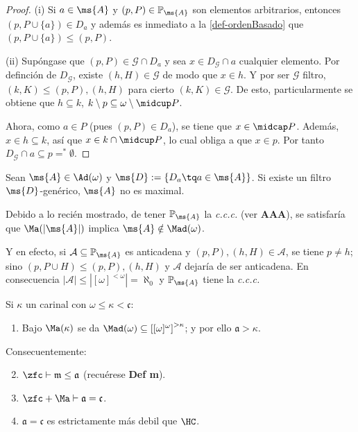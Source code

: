 	\begin{proof}
		(i) Si $a \in \ms{A}$ y $(p,P) \in \mathbb{P}_\ms{A}$ son elementos arbitrarios, entonces $(p,P\cup\{a\}) \in D_a$ y además es inmediato a la \autoref{def-ordenBasado} que $(p,P\cup\{a\}) \leq (p,P)$.

		(ii) Supóngase que $(p,P) \in \mathcal{G} \cap D_a$ y sea $x \in D_\mathcal{G} \cap a$ cualquier elemento. Por definción de $D_\mathcal{G}$, existe $(h,H) \in \mathcal{G}$ de modo que $x \in h$. Y por ser $\mathcal{G}$ filtro, $(k,K) \leq (p,P),(h,H)$ para cierto $(k,K) \in \mathcal{G}$. De esto, particularmente se obtiene que $h \subseteq k$, $k \setminus p \subseteq \omega \setminus \midcup P$.

		Ahora, como $a \in P$ (pues $(p,P)\in D_a$), se tiene que $x \in \midcap P$. Además, $x \in h \subseteq k$, así que $x \in k \cap \midcup P$, lo cual obliga a que $x \in p$. Por tanto $D_\mathcal{G} \cap a \subseteq p =^* \emptyset$. 
	\end{proof}

	\begin{corolario}\label{cor-SolovayDebil}
		Sean $\ms{A} \in \Ad(\omega)$ y $\ms{D}:=\{D_a \tq a \in \ms{A}\}$. Si existe un filtro $\ms{D}$-genérico, $\ms{A}$ no es maximal.
	\end{corolario}

	Debido a lo recién mostrado, de tener $\mathbb{P}_\ms{A}$ la \textit{c.c.c.} (ver \textbf{AAA}), se satisfaría que $\Ma(|\ms{A}|)$ implica $\ms{A} \notin \Mad(\omega)$.

	Y en efecto, si $\mathcal{A} \subseteq \mathbb{P}_\ms{A}$ es anticadena y $(p,P),(h,H) \in \mathcal{A}$, se tiene $p\neq h$; sino $(p,P \cup H) \leq (p,P),(h,H)$ y $\mathcal{A}$ dejaría de ser anticadena. En consecuencia $|\mathcal{A}|\leq|[\omega]^{<\omega}|=\aleph_0$ y $\mathbb{P}_\ms{A}$ tiene la \textit{c.c.c.}

	\begin{corolario}\label{cor-MaSimple}
		Si $\kappa$ un carinal con $\omega \leq \kappa <\mathfrak{c}$:
		\begin{enumerate}
			\item Bajo $\Ma(\kappa)$ se da $\Mad(\omega) \subseteq \left[[\omega]^\omega\right]^{>\kappa}$; y por ello $\mathfrak{a}>\kappa$.
		\end{enumerate}
		Consecuentemente:
		\begin{enumerate}\setcounter {enumi}{1}
			\item $\zfc \vdash \mathfrak{m} \leq \mathfrak{a}$ (recuérese \textbf{Def m}).
			\item $\zfc + \Ma \vdash \mathfrak{a}=\mathfrak{c}$.
			\item $\mathfrak{a} = \mathfrak{c}$ es estrictamente más debil que $\HC$.
		\end{enumerate}
	\end{corolario}

